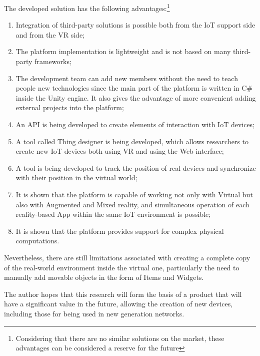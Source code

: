 The developed solution has the following advantages:\footnote{Considering that there are no similar solutions on the market, these advantages can be considered a reserve for the future}
\begin{enumerate}
    \item Integration of third-party solutions is possible both from the IoT support side and from the VR side;
    \item The platform implementation is lightweight and is not based on many third-party frameworks;
    \item The development team can add new members without the need to teach people new technologies since the main part of the platform is written in C# inside the Unity engine. It also gives the advantage of more convenient adding external projects into the platform;
    \item An API is being developed to create elements of interaction with IoT devices;
    \item A tool called Thing designer is being developed, which allows researchers to create new IoT devices both using VR and using the Web interface;
    \item A tool is being developed to track the position of real devices and synchronize with their position in the virtual world;
    \item It is shown that the platform is capable of working not only with Virtual but also with Augmented and Mixed reality, and simultaneous operation of each reality-based App within the same IoT environment is possible;
    \item It is shown that the platform provides support for complex physical computations.
\end{enumerate}

Nevertheless, there are still limitations associated with creating a complete copy of the real-world environment inside the virtual one, particularly the need to manually add movable objects in the form of Items and Widgets.

The author hopes that this research will form the basis of a product that will have a significant value in the future, allowing the creation of new devices, including those for being used in new generation networks.